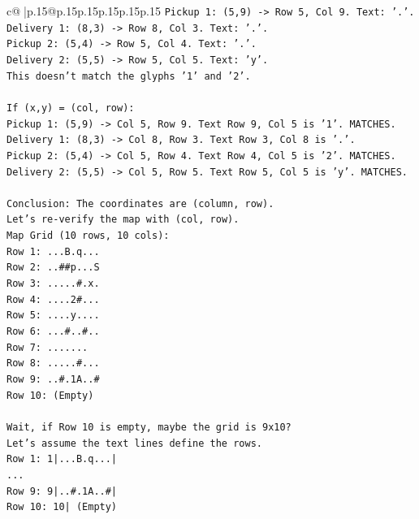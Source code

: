 \documentclass{article}
\begin{document}
{\begin{supertabular}{c@{$\;$}|p{.15\linewidth}@{}p{.15\linewidth}p{.15\linewidth}p{.15\linewidth}p{.15\linewidth}p{.15\linewidth}}
{{{\texttt{Pickup 1: (5,9) {-}> Row 5, Col 9. Text: '.'.} \\
\texttt{Delivery 1: (8,3) {-}> Row 8, Col 3. Text: '.'.} \\
\texttt{Pickup 2: (5,4) {-}> Row 5, Col 4. Text: '.'.} \\
\texttt{Delivery 2: (5,5) {-}> Row 5, Col 5. Text: 'y'.} \\
\texttt{This doesn't match the glyphs '1' and '2'.} \\
\\ 
\texttt{If (x,y) = (col, row):} \\
\texttt{Pickup 1: (5,9) {-}> Col 5, Row 9. Text Row 9, Col 5 is '1'. MATCHES.} \\
\texttt{Delivery 1: (8,3) {-}> Col 8, Row 3. Text Row 3, Col 8 is '.'.} \\
\texttt{Pickup 2: (5,4) {-}> Col 5, Row 4. Text Row 4, Col 5 is '2'. MATCHES.} \\
\texttt{Delivery 2: (5,5) {-}> Col 5, Row 5. Text Row 5, Col 5 is 'y'. MATCHES.} \\
\\ 
\texttt{Conclusion: The coordinates are (column, row).} \\
\texttt{Let's re{-}verify the map with (col, row).} \\
\texttt{Map Grid (10 rows, 10 cols):} \\
\texttt{Row 1: ...B.q...} \\
\texttt{Row 2: ..\#\#p...S} \\
\texttt{Row 3: .....\#.x.} \\
\texttt{Row 4: ....2\#...} \\
\texttt{Row 5: ....y....} \\
\texttt{Row 6: ...\#..\#..} \\
\texttt{Row 7: .......} \\
\texttt{Row 8: .....\#...} \\
\texttt{Row 9: ..\#.1A..\#} \\
\texttt{Row 10: (Empty)} \\
\\ 
\texttt{Wait, if Row 10 is empty, maybe the grid is 9x10?} \\
\texttt{Let's assume the text lines define the rows.} \\
\texttt{Row 1: 1|...B.q...|} \\
\texttt{...} \\
\texttt{Row 9: 9|..\#.1A..\#|} \\
\texttt{Row 10: 10| (Empty)} \\
}}}
\end{supertabular}}
\end{document}
